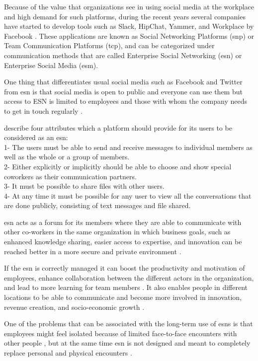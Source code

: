 Because of the value that organizations see in using social media at the workplace and high demand for such platforms, during the recent years several companies have started to develop tools such as Slack, HipChat, Yammer, and Workplace by Facebook \citep{Leroy2013}. These applications are known as Social Networking Platforms (\ac{snp}) or Team Communication Platforms (\ac{tcp}), and can be categorized under communication methods that are called Enterprise Social Networking (\ac{esn}) or Enterprise Social Media (\ac{esm}).

One thing that differentiates usual social media such as Facebook and Twitter from \ac{esn} is that social media is open to public and everyone can use them but access to ESN is limited to employees and those with whom the company needs to get in touch regularly \citep{Turban2011}.

\citet{Leonardi2013} describe four attributes which a platform should provide for its users to be considered as an \ac{esn}:\\
1- The users must be able to send and receive messages to individual members as well as the whole or a group of members. \\
2- Either explicitly or implicitly should be able to choose and show special coworkers as their communication partners.\\
3- It must be possible to share files with other users.\\
4- At any time it must be possible for any user to view all the conversations that are done publicly, consisting of text messages and file shared.

\ac{esn} acts as a forum for its members where they are able to communicate with other co-workers in the same organization \citep{Leonardi2014} in which business goals, such as enhanced knowledge sharing, easier access to expertise, and innovation can be reached better in a more secure and private environment \citep{Leonardi2013}.

If the \ac{esn} is correctly managed it can boost the productivity and motivation of employees, enhance collaboration between the different actors in the organization, and lead to more learning for team members \citep{Leon2017}. It also enables people in different locations to be able to communicate and become more involved in innovation, revenue creation, and socio-economic growth \citep{Qi2016}.

One of the problems that can be associated with the long-term use of \ac{esn}s is that employees might feel isolated because of limited face-to-face encounters with other people \citep{Kane2014}, but at the same time \ac{esn} is not designed and meant to completely replace personal and physical encounters \citep{Zhang2013a}.

